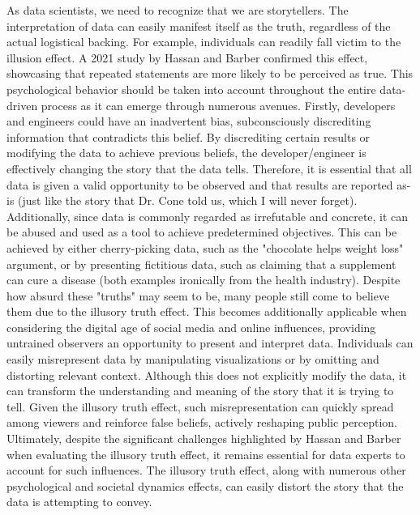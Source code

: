 \documentclass[12pt]{article}
\begin{document}
\begin{text}
As data scientists, we need to recognize that we are storytellers. The interpretation of data can easily manifest itself as the truth, regardless of the actual logistical backing. For example, individuals can readily fall victim to the illusion effect. A 2021 study by Hassan and Barber confirmed this effect, showcasing that repeated statements are more likely to be perceived as true. This psychological behavior should be taken into account throughout the entire data-driven process as it can emerge through numerous avenues. Firstly, developers and engineers could have an inadvertent bias, subconsciously discrediting information that contradicts this belief. By discrediting certain results or modifying the data to achieve previous beliefs, the developer/engineer is effectively changing the story that the data tells. Therefore, it is essential that all data is given a valid opportunity to be observed and that results are reported as-is (just like the story that Dr. Cone told us, which I will never forget). Additionally, since data is commonly regarded as irrefutable and concrete, it can be abused and used as a tool to achieve predetermined objectives. This can be achieved by either cherry-picking data, such as the "chocolate helps weight loss" argument, or by presenting fictitious data, such as claiming that a supplement can cure a disease (both examples ironically from the health industry). Despite how absurd these "truths" may seem to be, many people still come to believe them due to the illusory truth effect. This becomes additionally applicable when considering the digital age of social media and online influences, providing untrained observers an opportunity to present and interpret data. Individuals can easily misrepresent data by manipulating visualizations or by omitting and distorting relevant context. Although this does not explicitly modify the data, it can transform the understanding and meaning of the story that it is trying to tell. Given the illusory truth effect, such misrepresentation can quickly spread among viewers and reinforce false beliefs, actively reshaping public perception. Ultimately, despite the significant challenges highlighted by Hassan and Barber when evaluating the illusory truth effect, it remains essential for data experts to account for such influences. The illusory truth effect, along with numerous other psychological and societal dynamics effects, can easily distort the story that the data is attempting to convey.


\end{text}
\end{document}

